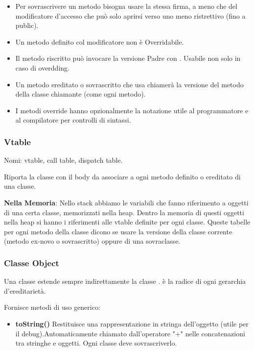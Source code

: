 \begin{itemize}
	\item Per sovrascrivere un metodo bisogna usare la stessa firma, a meno che del modificatore d'accesso che può solo aprirsi verso uno meno ristrettivo (fino a public).

	\item Un metodo definito col modificatore  non è Overridabile.

	\item Il metodo riscritto può invocare la versione Padre con . Usabile non solo in caso di overdding.

	\item Un metodo ereditato o sovrascritto che usa  chiamerà la versione del metodo della classe chiamante (come ogni metodo).

	\item I metodi override hanno opzionalmente la notazione  utile al programmatore e al compilatore per controlli di sintassi.
\end{itemize}

\subsubsection{Vtable}
Nomi: vtable, call table, dispatch table.

Riporta la classe con il body da associare a ogni metodo definito o ereditato di una classe.

\textbf{Nella Memoria}: Nello stack abbiamo le variabili che fanno riferimento a oggetti di una certa classe, memorizzati nella heap. Dentro la memoria di questi oggetti nella heap si hanno i riferimenti alle vtable definite per ogni classe. Queste tabelle per ogni metodo della classe dicono se usare la versione della classe corrente (metodo ex-novo o sovrascritto) oppure di una sovraclasse.

\subsubsection{Classe Object}
Una classe estende sempre indirettamente la classe .
 è la radice di ogni gerarchia d'ereditarietà.

Fornisce metodi di uso generico:
\begin{itemize}
	\item \textbf{toString()} Restituisce una rappresentazione in stringa dell'oggetto (utile per il debug).Automaticamente chiamato dall'operatore "+" nelle concatenazioni tra stringhe e oggetti.
	Ogni classe deve sovrascriverlo.
\end{itemize}


